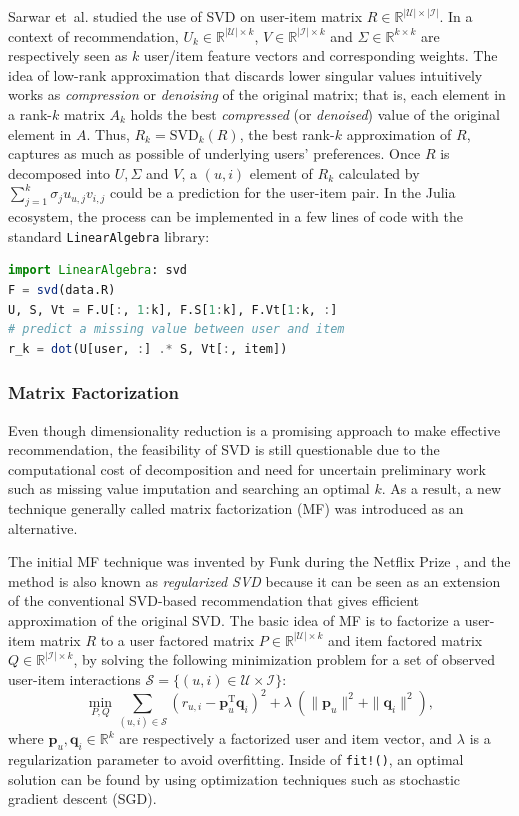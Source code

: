 Sarwar et~al. \cite{Sarwar2000} studied the use of SVD on user-item matrix $R \in \mathbb{R}^{|\mathcal{U}| \times |\mathcal{I}|}$. In a context of recommendation, $U_k \in \mathbb{R}^{|\mathcal{U}| \times k}$, $V \in \mathbb{R}^{|\mathcal{I}| \times k}$ and $\Sigma \in \mathbb{R}^{k \times k}$ are respectively seen as $k$ user/item feature vectors and corresponding weights. The idea of low-rank approximation that discards lower singular values intuitively works as \textit{compression} or \textit{denoising} of the original matrix; that is, each element in a rank-$k$ matrix $A_k$ holds the best \textit{compressed} (or \textit{denoised}) value of the original element in $A$. Thus, $R_k = \mathrm{SVD}_k(R)$, the best rank-$k$ approximation of $R$, captures as much as possible of underlying users' preferences. Once $R$ is decomposed into $U, \Sigma$ and $V$, a $(u, i)$ element of $R_k$ calculated by $\sum^k_{j=1} \sigma_j u_{u, j} v_{i, j}$ could be a prediction for the user-item pair. In the Julia ecosystem, the process can be implemented in a few lines of code with the standard \texttt{LinearAlgebra} library:

\begin{lstlisting}[language = Julia]
import LinearAlgebra: svd
F = svd(data.R)
U, S, Vt = F.U[:, 1:k], F.S[1:k], F.Vt[1:k, :]
# predict a missing value between user and item
r_k = dot(U[user, :] .* S, Vt[:, item])
\end{lstlisting}

\subsubsection{Matrix Factorization}

Even though dimensionality reduction is a promising approach to make effective recommendation, the feasibility of SVD is still questionable due to the computational cost of decomposition and need for uncertain preliminary work such as missing value imputation and searching an optimal $k$. As a result, a new technique generally called matrix factorization (MF) was introduced \cite{Koren2009} as an alternative.

The initial MF technique was invented by Funk \cite{Funk2006} during the Netflix Prize \cite{Bennett07thenetflix}, and the method is also known as \textit{regularized SVD} because it can be seen as an extension of the conventional SVD-based recommendation that gives efficient approximation of the original SVD. The basic idea of MF is to factorize a user-item matrix $R$ to a user factored matrix $P \in \mathbb{R}^{|\mathcal{U}| \times k}$ and item factored matrix $Q \in \mathbb{R}^{|\mathcal{I}| \times k}$, by solving the following minimization problem for a set of observed user-item interactions $\mathcal{S} = \{(u, i) \in \mathcal{U} \times \mathcal{I}\}$:
$$
  \min_{P, Q} \sum_{(u, i) \in \mathcal{S}} \left( r_{u,i} - \mathbf{p}_u^{\mathrm{T}} \mathbf{q}_i \right)^2 + \lambda \ (\|\mathbf{p}_u\|^2 + \|\mathbf{q}_i\|^2),
$$
where $\mathbf{p}_u, \mathbf{q}_i \in \mathbb{R}^k$ are respectively a factorized user and item vector, and $\lambda$ is a regularization parameter to avoid overfitting. Inside of \texttt{fit!()}, an optimal solution can be found by using optimization techniques such as stochastic gradient descent (SGD).

